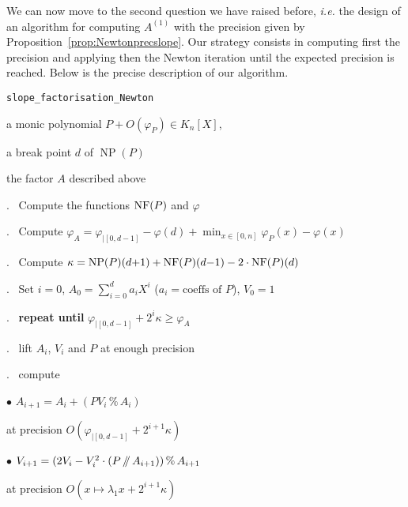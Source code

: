 \documentclass{sig-alternate-2013}
\DeclareMathOperator{\NP}{NP}
\newcommand{\NF}{\text{\rm NF}}
\renewcommand{\mod}{\,\%\,}
\renewcommand{\div}{\,/\hspace{-0.3em}/\,}
\begin{document}
We can now move to the second question we have raised before, 
\emph{i.e.} the design of an algorithm for computing $A^{(1)}$ with the 
precision given by Proposition~\ref{prop:Newtonprecslope}. Our strategy 
consists in computing first the precision and applying then the Newton 
iteration until the expected precision is reached. Below is the
precise description of our algorithm.

\noindent\hrulefill

 {\tt slope\_factorisation\_Newton}

 a monic polynomial $P + O(\varphi_P) \in K_n[X]$,

\noindent{}a break point $d$ of $\NP(P)$

 the factor $A$ described above

\smallskip{}.\ %
Compute the functions $\NF(P)$ and $\varphi$

\smallskip{}.\ %
Compute $\varphi_A = \varphi_{|[0,d-1]} - \varphi(d) + \min_{x \in [0,n]}
\varphi_P(x) - \varphi(x)$

\smallskip{}.\ %
Compute $\kappa = \NP(P)(d{+}1) + \NF(P)(d{-}1) - 2 \cdot \NF(P)(d)$

\smallskip{}.\ %
Set $i = 0$, $A_0 = \sum_{i=0}^d a_i X^i$
($a_i = \text{coeffs of } P$), $V_0 = 1$

\smallskip{}.\ %
{\bf repeat until} $\varphi_{|[0,d{-}1]} + 2^i \kappa \geq \varphi_A$

\smallskip{}.\ \hspace{5mm}%
lift $A_i$, $V_i$ and $P$ at enough precision

\smallskip{}.\ \hspace{5mm}%
compute 

\smallskip

\hspace{1cm}$\bullet$
$A_{i+1} = A_i + (P V_i \mod A_i)$

\hspace{1cm}\phantom{$\bullet$ }%
at precision $O(\varphi_{|[0,d{-}1]} + 2^{i+1} \kappa)$

\smallskip

\hspace{1cm}$\bullet$
$V_{i+1} = (2 V_i - V_i^2 \cdot (P \div A_{i+1})) \mod A_{i+1}$

\hspace{1cm}\phantom{$\bullet$ }%
at precision $O(x \mapsto \lambda_1 x + 2^{i+1}\kappa)$
\end{document}
